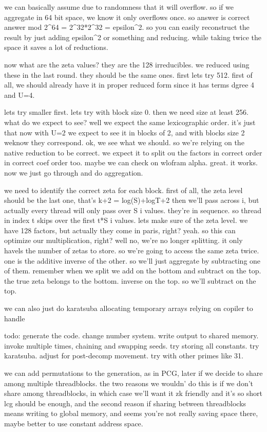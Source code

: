 we can basically assume due to randomness that it will overflow. so if we aggregate in 64 bit space, we know it only overflows once. so answer is correct answer mod 2^64 = 2^32*2^32 = epsilon^2. so you can easily reconstruct the result by just adding epsilon^2 or something and reducing. while taking twice the space it saves a lot of reductions. 

now what are the zeta values?
they are the 128 irreducibles. we reduced using these in the last round. they should be the same ones. 
first lets try 512. 
first of all, we should already have it in proper reduced form since it has terms dgree 4 and U=4.

lets try smaller first. lets try with block size 0. then we need size  at least 256. 
what do we expect to see? well we expect the same lexicographic order. it's just that now with U=2 we expect to see it in blocks of 2, and with blocks size 2 weknow they correspond. ok, we see what we should. 
so we're relying on the native reduction to be correct. we expect it to split ou the factors in correct order in correct coef order too. maybe we can check on wlofram alpha. great. it works. 
now we just go through and do aggregation. 

we need to identify the correct zeta for each block. 
first of all, the zeta level should be the last one, that's k+2 = log(S)+logT+2
then we'll pass across i, but actually every thread will only pass over S i values. they're in sequence. so thread in index t skips over the first t*S i values.
lets make sure of the zeta level. we have 128 factors, but actually they come in paris, right? yeah. so this can optimize our multiplication, right?
well no, we're no longer splitting. it only havels the number of zetas to store. so we're going to access the same zeta twice. one is the additive inverse of the other. so we'll just aggregate by subtracting one of them.
remember when we split we add on the bottom and subtract on the top. the true zeta belongs to the bottom. inverse on the top. so we'll subtract on the top. 

we can also just do karatsuba allocating temporary arrays relying on copiler to handle

todo:
generate the code.
change number system.
write output to shared memory.
invoke multiple times, chaining and swapping seeds. 
try storing all constants.
try karatsuba. 
adjust for post-decomp movement.
try with other primes like 31. 

we can add permutations to the generation, as in PCG, later if we decide to share among multiple threadblocks. the two reasons we wouldn' do this is if we don't share among threadblocks, in which case we'll want it zk friendly and it's so short lcg should be enough, and the second reason if sharing between threadblocks means writing to global memory, and seems you're not really saving space there, maybe better to use constant address space. 

